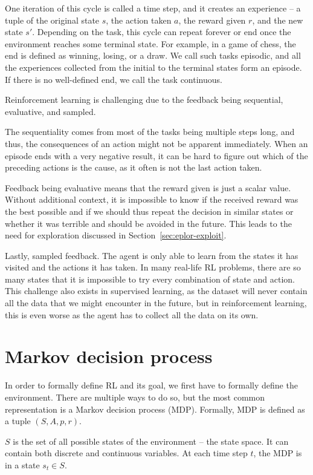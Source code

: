 \documentclass[
  digital,     %
  oneside,     %
  nosansbold,  %
  nocolorbold, %
  lof,         %
  lot,         %
]{fithesis4}
\begin{document}
One iteration of this cycle is called a time step, and it creates an experience -- a tuple of the original state $s$, the action taken $a$, the reward given $r$, and the new state $s'$. Depending on the task, this cycle can repeat forever or end once the environment reaches some terminal state. For example, in a game of chess, the end is defined as winning, losing, or a draw. We call such tasks episodic, and all the experiences collected from the initial to the terminal states form an episode. If there is no well-defined end, we call the task continuous.

Reinforcement learning is challenging due to the feedback being sequential, evaluative, and sampled.

The sequentiality comes from most of the tasks being multiple steps long, and thus, the consequences of an action might not be apparent immediately. When an episode ends with a very negative result, it can be hard to figure out which of the preceding actions is the cause, as it often is not the last action taken.

Feedback being evaluative means that the reward given is just a scalar value. Without additional context, it is impossible to know if the received reward was the best possible and if we should thus repeat the decision in similar states or whether it was terrible and should be avoided in the future. This leads to the need for exploration discussed in Section~\ref{sec:eplor-exploit}.

Lastly, sampled feedback. The agent is only able to learn from the states it has visited and the actions it has taken. In many real-life RL problems, there are so many states that it is impossible to try every combination of state and action. This challenge also exists in supervised learning, as the dataset will never contain all the data that we might encounter in the future, but in reinforcement learning, this is even worse as the agent has to collect all the data on its own.

\section{Markov decision process}
In order to formally define RL and its goal, we first have to formally define the environment. There are multiple ways to do so, but the most common representation is a Markov decision process (MDP). Formally, MDP is defined as a tuple $(S, A, p, r)$.

$S$ is the set of all possible states of the environment -- the state space. It can contain both discrete and continuous variables. At each time step $t$, the MDP is in a state $s_t\in S$.
\end{document}
